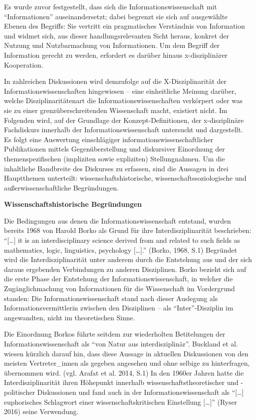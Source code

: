 \documentclass[a4paper,
fontsize=11pt,
oneside,
numbers=noperiodatend,
parskip=half-,
bibliography=totoc,
final
]{scrartcl}
\begin{document}
Es wurde zuvor festgestellt, dass sich die Informationswissenschaft mit
\enquote{Informationen} auseinandersetzt; dabei begrenzt sie sich auf
ausgewählte Ebenen des Begriffs: Sie vertritt ein pragmatisches
Verständnis von Information und widmet sich, aus dieser
handlungsrelevanten Sicht heraus, konkret der Nutzung und Nutzbarmachung
von Informationen. Um dem Begriff der Information gerecht zu werden,
erfordert es darüber hinaus x-disziplinärer Kooperation.

In zahlreichen Diskussionen wird demzufolge auf die X-Disziplinarität
der Informationswissenschaften hingewiesen -- eine einheitliche Meinung
darüber, welche Disziplinaritätenart die Informationswissenschaften
verkörpert oder was sie zu einer grenzüberschreitenden Wissenschaft
macht, existiert nicht. Im Folgenden wird, auf der Grundlage der
Konzept-Definitionen, der x-disziplinäre Fachdiskurs innerhalb der
Informationswissenschaft untersucht und dargestellt. Es folgt eine
Auswertung einschlägiger informationswissenschaftlicher Publikationen
mittels Gegenüberstellung und diskursiver Einordnung der
themenspezifischen (impliziten sowie expliziten) Stellungnahmen. Um die
inhaltliche Bandbreite des Diskurses zu erfassen, sind die Aussagen in
drei Hauptthemen unterteilt: wissenschaftshistorische,
wissenschaftssoziologische und außerwissenschaftliche Begründungen.

\textbf{Wissenschaftshistorische Begründungen}

Die Bedingungen aus denen die Informationswissenschaft entstand, wurden
bereits 1968 von Harold Borko als Grund für ihre Interdisziplinarität
beschrieben: \enquote{{[}\ldots{}{]} it is an interdisciplinary science
derived from and related to such fields as mathematics, logic,
linguistics, psychology {[}\ldots{}{]}.} (Borko, 1968, S.1) Begründet
wird die Interdisziplinarität unter anderem durch die Entstehung aus und
der sich daraus ergebenden Verbindungen zu anderen Disziplinen. Borko
bezieht sich auf die erste Phase der Entstehung der
Informationswissenschaft, in welcher die Zugänglichmachung von
Informationen für die Wissenschaft im Vordergrund standen: Die
Informationswissenschaft stand nach dieser Auslegung als
Informationsvermittlerin zwischen den Disziplinen -- als
\enquote{Inter}-Disziplin im angewandten, nicht im theoretischen Sinne.

Die Einordnung Borkos führte seitdem zur wiederholten Betitelungen der
Informationswissenschaft als \enquote{von Natur aus interdisziplinär}.
Buckland et al. wiesen kürzlich darauf hin, dass diese Aussage in
aktuellen Diskussionen von den meisten Vertreter\_innen als gegeben
angesehen und ohne selbige zu hinterfragen, übernommen wird. (vgl.
Arafat et al. 2014, S.1) In den 1960er Jahren hatte die
Interdisziplinarität ihren Höhepunkt innerhalb
wissenschaftstheoretischer und -politischer Diskussionen und fand auch
in der Informationswissenschaft als \enquote{{[}\ldots{}{]} euphorisches
Schlagwort einer wissenschaftskritischen Einstellung {[}\ldots{}{]}}
(Ryser 2016) seine Verwendung.
\end{document}
